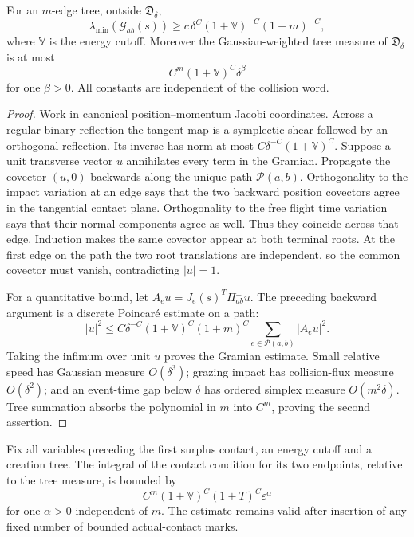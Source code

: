 \begin{lemma}
\label{lem:r5-b2-gramian}
For an \(m\)-edge tree, outside \(\mathfrak D_\delta\),
\[
 \lambda_{\min}(\mathcal G_{ab}(s))
 \ge c\,\delta^C(1+\mathbb V)^{-C}(1+m)^{-C},
\]
where \(\mathbb V\) is the energy cutoff.  Moreover the Gaussian-weighted
tree measure of \(\mathfrak D_\delta\) is at most
\[
 C^m(1+\mathbb V)^C\delta^\beta
\]
for one \(\beta>0\).  All constants are independent of the collision word.
\end{lemma}

\begin{proof}
Work in canonical position--momentum Jacobi coordinates.  Across a regular
binary reflection the tangent map is a symplectic shear followed by an
orthogonal reflection.  Its inverse has norm at most
\(C\delta^{-C}(1+\mathbb V)^C\).  Suppose a unit transverse vector \(u\)
annihilates every term in the Gramian.  Propagate the covector
\((u,0)\) backwards along the unique path \(\mathcal P(a,b)\).  Orthogonality
to the impact variation at an edge says that the two backward position
covectors agree in the tangential contact plane.  Orthogonality to the free
flight time variation says that their normal components agree as well.  Thus
they coincide across that edge.  Induction makes the same covector appear at
both terminal roots.  At the first edge on the path the two root translations
are independent, so the common covector must vanish, contradicting
\(|u|=1\).

For a quantitative bound, let \(A_eu=J_e(s)^T\Pi_{ab}^\perp u\).  The preceding
backward argument is a discrete Poincar\'e estimate on a path:
\[
 |u|^2\le C\delta^{-C}(1+\mathbb V)^C(1+m)^C
 \sum_{e\in\mathcal P(a,b)}|A_eu|^2.
\]
Taking the infimum over unit \(u\) proves the Gramian estimate.  Small relative
speed has Gaussian measure \(O(\delta^3)\); grazing impact has collision-flux
measure \(O(\delta^2)\); and an event-time gap below \(\delta\) has ordered
simplex measure \(O(m^2\delta)\).  Tree summation absorbs the polynomial in
\(m\) into \(C^m\), proving the second assertion.
\end{proof}

\begin{lemma}
\label{lem:r5-b2-first-cycle}
Fix all variables preceding the first surplus contact, an energy cutoff and a
creation tree.  The integral of the contact condition for its two endpoints,
relative to the tree measure, is bounded by
\[
 C^m(1+\mathbb V)^C(1+T)^C\varepsilon^\alpha
\]
for one \(\alpha>0\) independent of \(m\).  The estimate remains valid after
insertion of any fixed number of bounded actual-contact marks.
\end{lemma}

